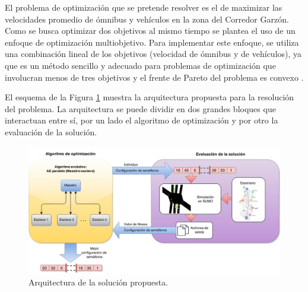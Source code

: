 El problema de optimización que se pretende resolver es el de maximizar las velocidades promedio de ómnibus y vehículos en la zona del Corredor Garzón. Como se busca optimizar dos objetivos al mismo tiempo se plantea el uso de un enfoque de optimización multiobjetivo. Para implementar este enfoque, se utiliza una combinación lineal de los objetivos (velocidad de ómnibus y de vehículos), ya que es un método sencillo y adecuado para problemas de optimización que involucran menos de tres objetivos y el frente de Pareto del problema es convexo \citep{coello2002evolutionary}.


El esquema de la Figura \ref{fig:arquitectura1}  muestra la arquitectura propuesta para la resolución del problema. La arquitectura se puede dividir en dos grandes bloques que interactuan entre sí, por un lado el algoritmo de optimización y por otro la evaluación de la solución. 

\begin{figure}[ht]
	\centering
	\includegraphics[width=0.99\linewidth]{Figures/arquitectura1}
	\caption{Arquitectura de la solución propuesta.}
	\label{fig:arquitectura1}
\end{figure}

